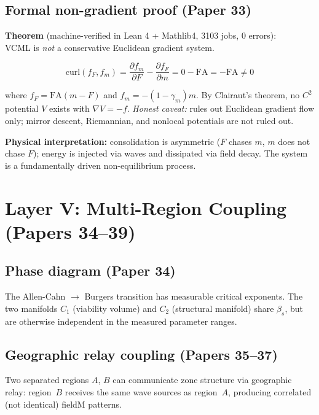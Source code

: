 \documentclass[11pt]{article}
\begin{document}
\subsection{Formal non-gradient proof (Paper 33)}

\textbf{Theorem} (machine-verified in Lean 4 + Mathlib4, 3103 jobs, 0 errors):\\[0.3em]
VCML is \emph{not} a conservative Euclidean gradient system.

\begin{equation}
\text{curl}(f_F, f_m) = \frac{\partial f_m}{\partial F} - \frac{\partial f_F}{\partial m}
= 0 - \mathrm{FA} = -\mathrm{FA} \neq 0
\end{equation}

where $f_F = \mathrm{FA}(m - F)$ and $f_m = -(1-\gamma_m)m$.
By Clairaut's theorem, no $C^2$ potential $V$ exists with $\nabla V = -f$.
\emph{Honest caveat:} rules out Euclidean gradient flow only; mirror descent,
Riemannian, and nonlocal potentials are not ruled out.

\textbf{Physical interpretation:} consolidation is asymmetric ($F$ chases $m$, $m$ does
not chase $F$); energy is injected via waves and dissipated via field decay.
The system is a fundamentally driven non-equilibrium process.

\section{Layer V: Multi-Region Coupling (Papers 34--39)}

\subsection{Phase diagram (Paper 34)}

The Allen-Cahn $\to$ Burgers transition has measurable critical exponents.
The two manifolds $C_1$ (viability volume) and $C_2$ (structural manifold) share $\beta_s$,
but are otherwise independent in the measured parameter ranges.

\subsection{Geographic relay coupling (Papers 35--37)}

Two separated regions $A$, $B$ can communicate zone structure via geographic relay:
region~$B$ receives the same wave sources as region~$A$, producing correlated
(not identical) fieldM patterns.
\end{document}
